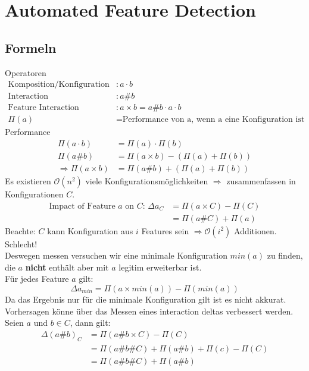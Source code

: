\documentclass{article}
\begin{document}
	
	\tableofcontents 
	\newpage
	\section{Automated Feature Detection}
	\subsection{Formeln\cite{PredictingPerformanceAutmatedFeatureDetectionSiegmund2012}}
	
Operatoren
\begin{align*}
\text{Komposition/Konfiguration} &:  a \cdot b\\
\text{Interaction} &: a\#b\\
\text{Feature Interaction} &: a\times b = a\#b \cdot a \cdot b\\
\Pi(a)  &= \text{Performance von a, wenn a eine Konfiguration ist} 
\end{align*}
Performance
\begin{align*}
	\Pi(a \cdot b) &= \Pi(a) \cdot \Pi(b)\\
	\Pi(a\#b) &= \Pi(a \times b) - (\Pi(a) + \Pi(b))\\
	\Rightarrow \Pi(a \times b) &=  \Pi(a\#b) + (\Pi(a) + \Pi(b))
\end{align*}
	Es existieren $\mathcal{O}(n^2)$ viele Konfigurationsmöglichkeiten $\Rightarrow$ zusammenfassen in Konfigurationen $C$.
\begin{align*}
\text{Impact  of Feature $a$ on $C$: } \Delta a_C &= \Pi(a \times C) - \Pi(C)\\
&= \Pi(a\#C) + \Pi(a)
\end{align*}
Beachte: $C$ kann Konfiguration aus $i$ Features sein $\Rightarrow \mathcal{O}(i^2)$ Additionen. Schlecht!\\ 
	Deswegen messen versuchen wir eine minimale Konfiguration  $min(a)$  zu finden, die $a$ \textbf{nicht} enthält aber mit $a$ legitim erweiterbar ist.\\
	Für jedes Feature $a$ gilt:
	\begin{equation*}
	\Delta a_{min} = \Pi(a \times min(a)) - \Pi(min(a))
	\end{equation*}
	Da das Ergebnis nur für die minimale Konfiguration gilt ist es nicht akkurat.
	Vorhersagen könne über das Messen eines interaction deltas verbessert werden.
	Seien $a$ und $b \in C$, dann gilt: 
	\begin{equation*}
	\begin{split}
	\Delta (a\#b)_C &= \Pi(a\#b \times C ) - \Pi(C)\\
					&= \Pi(a\#b\#C ) + \Pi(a\#b) + \Pi(c)  - \Pi(C)\\
					&= \Pi(a\#b\#C ) + \Pi(a\#b)
	\end{split}
	\end{equation*}
	
\end{document}
